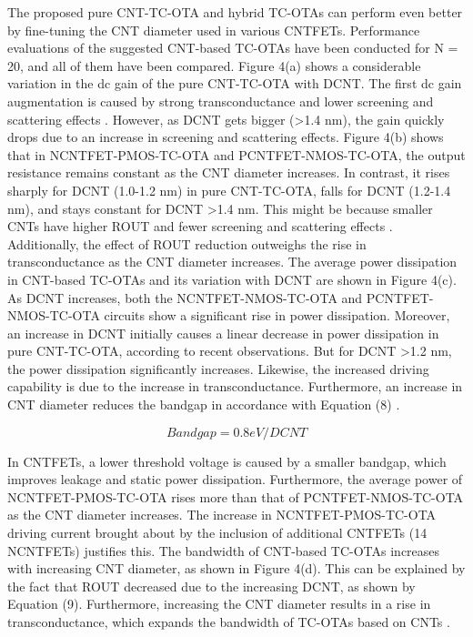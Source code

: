 The proposed pure CNT-TC-OTA and hybrid TC-OTAs can perform even better by
fine-tuning the CNT diameter used in various CNTFETs. Performance evaluations of
the suggested CNT-based TC-OTAs have been conducted for N = 20, and all of them
have been compared. Figure 4(a) shows a considerable variation in the dc gain of
the pure CNT-TC-OTA with DCNT. The first dc gain augmentation is caused by
strong transconductance and lower screening and scattering effects
\cite{ref6,ref30}. However, as DCNT gets bigger (\textgreater 1.4 nm), the gain
quickly drops due to an increase in screening and scattering effects. Figure
4(b) shows that in NCNTFET-PMOS-TC-OTA and PCNTFET-NMOS-TC-OTA, the output
resistance remains constant as the CNT diameter increases. In contrast, it rises
sharply for DCNT (1.0-1.2 nm) in pure CNT-TC-OTA, falls for DCNT (1.2-1.4 nm),
and stays constant for DCNT \textgreater 1.4 nm. This might be because smaller
CNTs have higher ROUT and fewer screening and scattering effects
\cite{ref6,ref13,ref14,ref15,ref16,ref17}. Additionally, the effect of ROUT
reduction outweighs the rise in transconductance as the CNT diameter increases.
The average power dissipation in CNT-based TC-OTAs and its variation with DCNT
are shown in Figure 4(c). As DCNT increases, both the NCNTFET-NMOS-TC-OTA and
PCNTFET-NMOS-TC-OTA circuits show a significant rise in power dissipation.
Moreover, an increase in DCNT initially causes a linear decrease in power
dissipation in pure CNT-TC-OTA, according to recent observations. But for DCNT
\textgreater 1.2 nm, the power dissipation significantly increases. Likewise,
the increased driving capability is due to the increase in transconductance.
Furthermore, an increase in CNT diameter reduces the bandgap in accordance with
Equation (8) \cite{ref14,ref18,ref35,ref36,ref37}.

\begin{equation}
  Bandgap = 0.8 eV / DCNT
  \label{eq:8}
\end{equation}

In CNTFETs, a lower threshold voltage is caused by a smaller bandgap, which
improves leakage and static power dissipation. Furthermore, the average power of
NCNTFET-PMOS-TC-OTA rises more than that of PCNTFET-NMOS-TC-OTA as the CNT
diameter increases. The increase in NCNTFET-PMOS-TC-OTA driving current brought
about by the inclusion of additional CNTFETs (14 NCNTFETs) justifies this. The
bandwidth of CNT-based TC-OTAs increases with increasing CNT diameter, as shown
in Figure 4(d). This can be explained by the fact that ROUT decreased due to the
increasing DCNT, as shown by Equation (9). Furthermore, increasing the CNT
diameter results in a rise in transconductance, which expands the bandwidth of
TC-OTAs based on CNTs \cite{ref16}.

